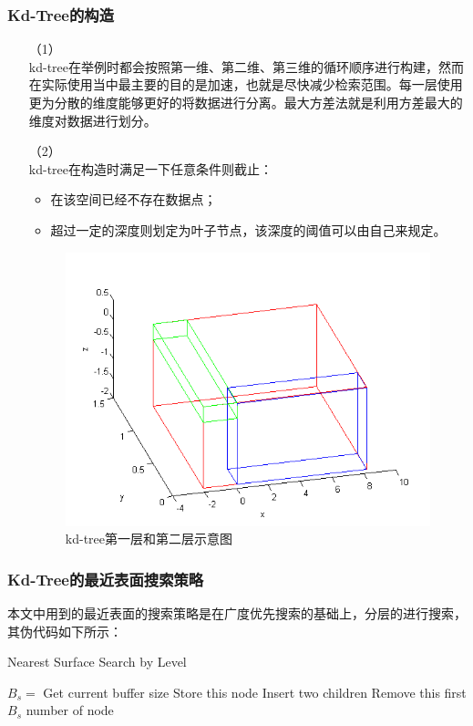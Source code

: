 \documentclass[10pt]{article}
\begin{document}
\subsubsection{Kd-Tree的构造}
\begin{itemize}
\item[（1）]{} \mbox{} \\
kd-tree在举例时都会按照第一维、第二维、第三维的循环顺序进行构建，然而在实际使用当中最主要的目的是加速，也就是尽快减少检索范围。每一层使用更为分散的维度能够更好的将数据进行分离。最大方差法就是利用方差最大的维度对数据进行划分。
\item[（2）]{} \mbox{} \\
kd-tree在构造时满足一下任意条件则截止：
\begin{itemize}
\item{在该空间已经不存在数据点；}
\item{超过一定的深度则划定为叶子节点，该深度的阈值可以由自己来规定。}
\end{itemize}

\begin{figure}[H]
\begin{center}
\includegraphics[scale=0.5]{kd-tree-structure.png}
\caption{kd-tree第一层和第二层示意图}
\end{center}
\end{figure}
\end{itemize}
\subsubsection{Kd-Tree的最近表面搜索策略}
本文中用到的最近表面的搜索策略是在广度优先搜索的基础上，分层的进行搜索，其伪代码如下所示：
\begin{algorithm}[H]
	\caption{Nearest Surface Search by Level}%
	\begin{algorithmic}[1]%
		\STATE $B_s =$ Get current buffer size
		\STATE Store this node
		\ENDIF		
		\ELSE
		\STATE Insert two children
		\ENDIF
		\STATE Remove this first $B_s$ number of node
		\ENDFOR
	\end{algorithmic}
\end{algorithm}
\end{document}
